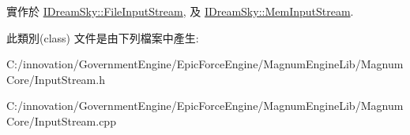 實作於 \hyperlink{class_i_dream_sky_1_1_file_input_stream_a0d2d5c30a1bbaa3a9f4209fae1c953d8}{I\+Dream\+Sky\+::\+File\+Input\+Stream}, 及 \hyperlink{class_i_dream_sky_1_1_mem_input_stream_a533bcf2b8e5b63c080656824fae97aa9}{I\+Dream\+Sky\+::\+Mem\+Input\+Stream}.



此類別(class) 文件是由下列檔案中產生\+:\begin{DoxyCompactItemize}
\item 
C\+:/innovation/\+Government\+Engine/\+Epic\+Force\+Engine/\+Magnum\+Engine\+Lib/\+Magnum\+Core/Input\+Stream.\+h\item 
C\+:/innovation/\+Government\+Engine/\+Epic\+Force\+Engine/\+Magnum\+Engine\+Lib/\+Magnum\+Core/Input\+Stream.\+cpp\end{DoxyCompactItemize}
